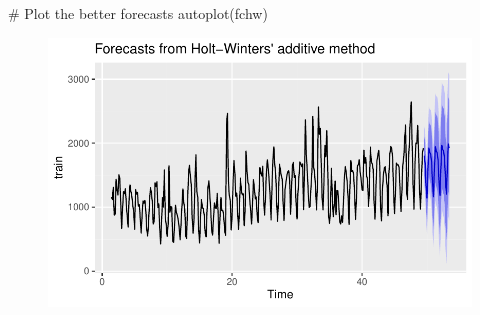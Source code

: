 \documentclass[
  letterpaper,
  DIV=11,
  numbers=noendperiod]{scrartcl}
\newenvironment{Shaded}{\begin{snugshade}}{\end{snugshade}}
\newcommand{\CommentTok}[1]{\textcolor[rgb]{0.37,0.37,0.37}{#1}}
\newcommand{\FunctionTok}[1]{\textcolor[rgb]{0.28,0.35,0.67}{#1}}
\newcommand{\NormalTok}[1]{\textcolor[rgb]{0.00,0.23,0.31}{#1}}
\begin{document}
\begin{Shaded}
\begin{Highlighting}[]
\CommentTok{\# Plot the better forecasts}
\FunctionTok{autoplot}\NormalTok{(fchw)}
\end{Highlighting}
\end{Shaded}

\begin{figure}[H]

{\centering \includegraphics{forecasting_datacamp_ex_files/figure-pdf/unnamed-chunk-18-1.pdf}

}

\end{figure}
\end{document}
